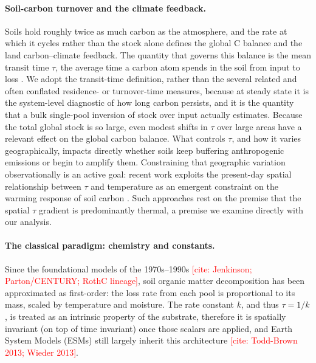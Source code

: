 \documentclass[12pt, a4paper]{article}
\newcommand{\PH}[1]{\textcolor{red}{#1}}
\begin{document}
\paragraph{Soil-carbon turnover and the climate feedback.}
Soils hold roughly twice as much carbon as the atmosphere, and the rate at which it
cycles rather than the stock alone defines the global C balance and the land carbon--climate feedback.
The quantity that governs this balance is the mean transit time $\tau$, the average time a carbon atom
spends in the soil from input to loss \citep{Sierra2017,Sierra2018}. We adopt the
transit-time definition, rather than the several related and often conflated
residence- or turnover-time measures, because at steady state it is the
system-level diagnostic of how long carbon persists, and it is the quantity that a
bulk single-pool inversion of stock over input actually estimates.
Because the total global stock is so large, even
modest shifts in $\tau$ over large areas have a relevant effect on the global carbon balance. What
controls $\tau$, and how it varies geographically, impacts directly whether soils
keep buffering anthropogenic emissions or begin to amplify them. Constraining that
geographic variation observationally is an active goal: recent work exploits the
present-day spatial relationship between $\tau$ and temperature as an emergent
constraint on the warming response of soil carbon \citep{Varney2020}. Such
approaches rest on the premise that the spatial $\tau$ gradient is predominantly
thermal, a premise we examine directly with our analysis.

\paragraph{The classical paradigm: chemistry and constants.}
Since the foundational models of the 1970s--1990s
\PH{[cite: Jenkinson; Parton/CENTURY; RothC lineage]}, soil organic matter decomposition has been approximated as 
first-order: the loss rate from each pool is proportional to its mass, scaled by
temperature and moisture. The rate constant $k$, and thus $\tau=1/k$, is
treated as an intrinsic property of the substrate, therefore it is spatially invariant (on top of time invariant) once those
scalars are applied, and Earth System Models (ESMs) still largely inherit this
architecture \PH{[cite: Todd-Brown 2013; Wieder 2013]}.
\end{document}
